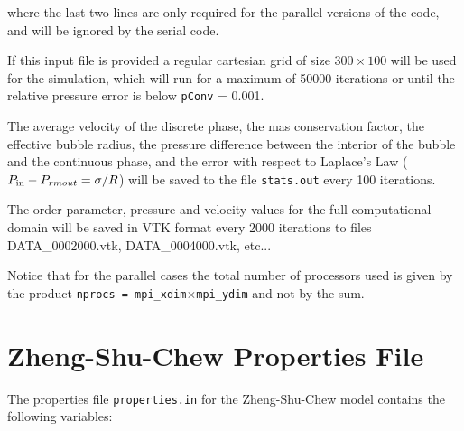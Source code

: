 \documentclass[12pt]{report}
\begin{document}
where the last two lines are only required for the parallel versions of the code, and will be ignored by the serial code.

If this input file is provided a regular cartesian grid of size $300\times100$ will be used for the simulation, which will run for a maximum of 50000 iterations or until the relative pressure error is below \verb+pConv+ = 0.001.

The average velocity of the discrete phase, the mas conservation factor, the effective bubble radius, the pressure difference between the interior of the bubble and the continuous phase, and the error with respect to Laplace's Law ($P_{\rm in} - P_{rm out} = \sigma/R$) will be saved to the file \verb+stats.out+ every 100 iterations.

The order parameter, pressure and velocity values for the full computational domain will be saved in VTK format every 2000 iterations to files DATA\_0002000.vtk, DATA\_0004000.vtk, etc...

Notice that for the parallel cases the total number of processors used is given by the product \texttt{nprocs = mpi\_xdim$\times$mpi\_ydim} and not by the sum.


\section{Zheng-Shu-Chew Properties File}
The properties file \verb+properties.in+ for the Zheng-Shu-Chew model contains the following variables:
\end{document}

